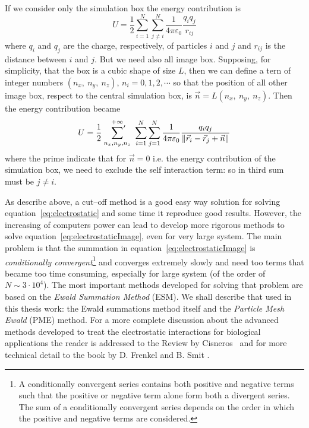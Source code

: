 If we consider only the simulation box the energy contribution is
\begin{equation}
	U = \frac{1}{2}\sum_{i=1}^N\sum_{j\ne i}^N\frac{1}{4\pi\varepsilon_0}\frac{q_iq_j}{r_{ij}}
	\label{eq:electrostatic}
\end{equation}
where $q_i$ and $q_j$ are the charge, respectively, of particles $i$ and $j$ and $r_{ij}$ is the distance between $i$ and $j$. But we need also all image box. Supposing, for simplicity, that the box is a cubic shape of size $L$, then we can define a tern of integer numbers $(n_x,\ n_y,\ n_z)$, $n_i=0,1,2,\cdots$ so that the position of all other image box, respect to the central simulation box, is $\vec n = L (n_x,\ n_y,\ n_z)$. Then the energy contribution became
\begin{equation}
	U = \frac{1}{2}\ \sideset{}{'}\sum_{n_x,n_y,n_z}^{+\infty}\ \sum_{i=1}^N\sum_{j=1}^N\frac{1}{4\pi\varepsilon_0}\frac{q_iq_j}{\|\vec r_i - \vec r_j + \vec n \|}
	\label{eq:electrostaticImage}
\end{equation}
where the prime indicate that for $\vec n = 0$ i.e. the energy contribution of the simulation box, we need to exclude the self interaction term: so in third sum must be $j \ne i$.

As describe above, a cut--off method is a good easy way solution for solving equation~\eqref{eq:electrostatic} and some time it reproduce good results. However, the increasing of computers power can lead to develop more rigorous methods to solve equation~\eqref{eq:electrostaticImage}, even for very large system. The main problem is that the summation in equation~\eqref{eq:electrostaticImage} is \textit{conditionally convergent}\footnote{A conditionally convergent series contains both positive and negative terms such that the positive or negative term alone form both a divergent series. The sum of a conditionally convergent series depends on the order in which the positive and negative terms are considered.} and converges extremely slowly and need too terms that became too time consuming, especially for large system (of the order of $N \sim 3\cdot 10^4$). The most important methods developed for solving that problem are based on the \textit{Ewald Summation Method} (\acs{ESM}). We shall describe that used in this thesis work: the Ewald summations method itself and the \textit{Particle Mesh Ewald} (\acs{PME}) method. For a more complete discussion about the advanced methods developed to treat the electrostatic interactions for biological applications the reader is addressed to the Review by Cisneros \etal\, \cite{Cisneros} and for more technical detail to the book by D. Frenkel and B. Smit \cite{Frenkel}.

